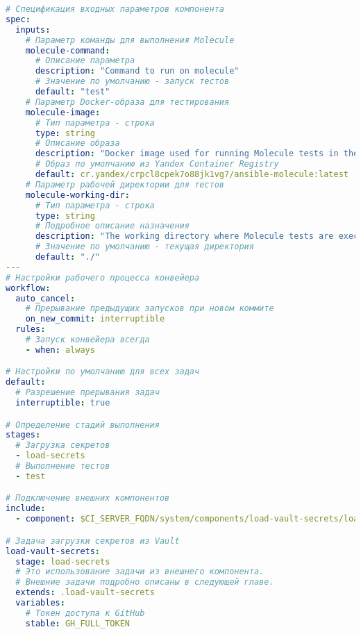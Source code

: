 \begin{lstlisting}[language=yaml,label={lst:component-pipeline},caption={Компонентный конвейер тестирования через Molecule}]
# Спецификация входных параметров компонента
spec:
  inputs:
    # Параметр команды для выполнения Molecule
    molecule-command:
      # Описание параметра
      description: "Command to run on molecule"
      # Значение по умолчанию - запуск тестов
      default: "test"
    # Параметр Docker-образа для тестирования
    molecule-image:
      # Тип параметра - строка
      type: string
      # Описание образа
      description: "Docker image used for running Molecule tests in the pipeline"
      # Образ по умолчанию из Yandex Container Registry
      default: cr.yandex/crpcl8cpek7o88jk1vg7/ansible-molecule:latest
    # Параметр рабочей директории для тестов
    molecule-working-dir:
      # Тип параметра - строка
      type: string
      # Подробное описание назначения
      description: "The working directory where Molecule tests are executed. This directory is set as the MOLECULE_PROJECT_DIRECTORY environment variable during the pipeline run."
      # Значение по умолчанию - текущая директория
      default: "./"
---
# Настройки рабочего процесса конвейера
workflow:
  auto_cancel:
    # Прерывание предыдущих запусков при новом коммите
    on_new_commit: interruptible
  rules:
    # Запуск конвейера всегда
    - when: always

# Настройки по умолчанию для всех задач
default:
  # Разрешение прерывания задач
  interruptible: true

# Определение стадий выполнения
stages:
  # Загрузка секретов
  - load-secrets
  # Выполнение тестов
  - test

# Подключение внешних компонентов
include:
  - component: $CI_SERVER_FQDN/system/components/load-vault-secrets/load-vault-secrets@2

# Задача загрузки секретов из Vault
load-vault-secrets:
  stage: load-secrets
  # Это использование задачи из внешнего компонента.
  # Внешние задачи подробно описаны в следующей главе.
  extends: .load-vault-secrets
  variables:
    # Токен доступа к GitHub
    stable: GH_FULL_TOKEN


\end{lstlisting}
